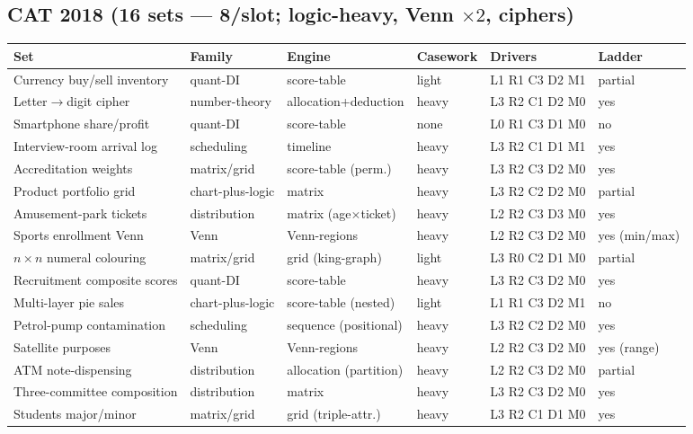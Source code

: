 \documentclass[11pt,a4paper]{article}
\newcommand{\invtab}{\footnotesize}
\begin{document}
\subsection{CAT 2018 (16 sets --- 8/slot; logic-heavy, Venn $\times2$, ciphers)}
{\invtab
\begin{longtable}{p{3.0cm}p{2.05cm}p{2.5cm}p{1.2cm}p{2.05cm}p{1.7cm}}
\toprule
\textbf{Set} & \textbf{Family} & \textbf{Engine} & \textbf{Casework} & \textbf{Drivers} & \textbf{Ladder} \\
\midrule
\endhead
Currency buy/sell inventory & quant-DI & score-table & light & L1 R1 C3 D2 M1 & partial \\
Letter$\to$digit cipher & number-theory & allocation+deduction & heavy & L3 R2 C1 D2 M0 & yes \\
Smartphone share/profit & quant-DI & score-table & none & L0 R1 C3 D1 M0 & no \\
Interview-room arrival log & scheduling & timeline & heavy & L3 R2 C1 D1 M1 & yes \\
Accreditation weights & matrix/grid & score-table (perm.) & heavy & L3 R2 C3 D2 M0 & yes \\
Product portfolio grid & chart-plus-logic & matrix & heavy & L3 R2 C2 D2 M0 & partial \\
Amusement-park tickets & distribution & matrix (age$\times$ticket) & heavy & L2 R2 C3 D3 M0 & yes \\
Sports enrollment Venn & Venn & Venn-regions & heavy & L2 R2 C3 D2 M0 & yes (min/max) \\
$n\times n$ numeral colouring & matrix/grid & grid (king-graph) & light & L3 R0 C2 D1 M0 & partial \\
Recruitment composite scores & quant-DI & score-table & heavy & L3 R2 C3 D2 M0 & yes \\
Multi-layer pie sales & chart-plus-logic & score-table (nested) & light & L1 R1 C3 D2 M1 & no \\
Petrol-pump contamination & scheduling & sequence (positional) & heavy & L3 R2 C2 D2 M0 & yes \\
Satellite purposes & Venn & Venn-regions & heavy & L2 R2 C3 D2 M0 & yes (range) \\
ATM note-dispensing & distribution & allocation (partition) & heavy & L2 R2 C3 D2 M0 & partial \\
Three-committee composition & distribution & matrix & heavy & L3 R2 C3 D2 M0 & yes \\
Students major/minor & matrix/grid & grid (triple-attr.) & heavy & L3 R2 C1 D1 M0 & yes \\
\bottomrule
\end{longtable}}
\end{document}
